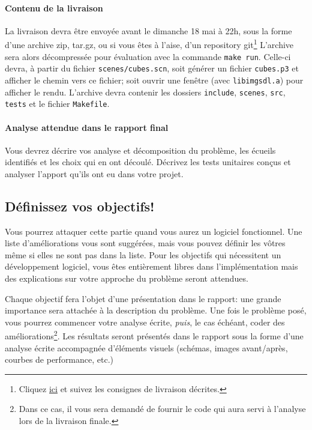 \documentclass[10pt, a4paper ]{article}
\begin{document}
\paragraph{Contenu de la livraison} La livraison devra être envoyée avant le
dimanche 18 mai à 22h, sous la forme d'une archive zip, tar.gz, ou si vous êtes
à l'aise, d'un repository git\footnote{Cliquez
    \href{https://github.com/xoolive/edu-raytracer/blob/master/github.md}{ici}
    et suivez les consignes de livraison décrites.}  L'archive sera alors
    décompressée pour évaluation avec la commande \texttt{make run}. Celle-ci
    devra, à partir du fichier \texttt{scenes/cubes.scn},  soit générer un
    fichier \texttt{cubes.p3} et afficher le chemin vers ce fichier; soit ouvrir
    une fenêtre (avec \texttt{libimgsdl.a}) pour afficher le rendu.  L'archive
    devra contenir les dossiers \texttt{include}, \texttt{scenes}, \texttt{src},
    \texttt{tests} et le fichier \texttt{Makefile}.


\paragraph{Analyse attendue dans le rapport final} Vous devrez décrire vos
analyse et décomposition du problème, les écueils identifiés et les choix qui en
ont découlé. Décrivez les tests unitaires conçus et analyser l'apport qu'ils ont
eu dans votre projet.


\subsection{Définissez vos objectifs! }
\label{sec:obj}

Vous pourrez attaquer cette partie quand vous aurez un logiciel fonctionnel. Une
liste d'améliorations vous sont suggérées, mais vous pouvez définir les vôtres
même si elles ne sont pas dans la liste. Pour les objectifs qui nécessitent un
développement logiciel, vous êtes entièrement libres dans l'implémentation mais
des explications sur votre approche du problème seront attendues.

Chaque objectif fera l'objet d'une présentation dans le rapport: une grande
importance sera attachée à la description du problème. Une fois le problème
posé, vous pourrez commencer votre analyse écrite, \emph{puis}, le cas échéant,
coder des améliorations\footnote{Dans ce cas, il vous sera demandé de fournir le
code qui aura servi à l'analyse lors de la livraison finale.}. Les résultats
seront présentés dans le rapport sous la forme d'une analyse écrite accompagnée
d'éléments visuels (schémas, images avant/après, courbes de performance, etc.)
\end{document}
